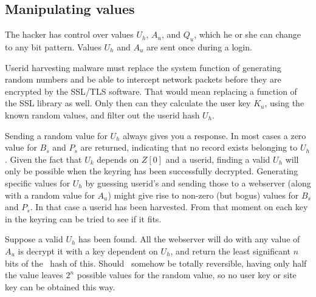 \subsection{Manipulating values}
\label{sec:manipulating_values}
The hacker has control over values $U_h$, $A_u$, and $Q_u$, which he or she can change to any bit pattern.
Values $U_h$ and $A_u$ are sent once during a login.
\par
Userid harvesting malware must replace the system function of generating random numbers
and be able to intercept network packets before they are encrypted by the SSL/TLS software.
That would mean replacing a function of the SSL library as well.
Only then can they calculate the user key $K_u$,
using the known random values,
and filter out the userid hash $U_h$.
\par
Sending a random value for $U_h$ always gives you a response.
In most cases a zero value for $B_s$ and $P_s$ are returned,
indicating that no record exists belonging to $U_h$.
Given the fact that $U_k$ depends on $Z[0]$ and a userid,
finding a valid $U_h$ will only be possible when the keyring
has been successfully decrypted.
Generating specific values for $U_h$ by guessing userid's and sending those to a webserver
(along with a random value for $A_u$)
might give rise to non-zero
(but bogus)
values for $B_s$ and $P_s$.
In that case a userid has been harvested.
From that moment on each key in the keyring can be tried to see if it fits.
\par
Suppose a valid $U_h$ has been found.
All the webserver will do with any value of $A_u$ is decrypt it with a key dependent on $U_h$,
and return the least significant $n$ bits of the \SHA\ hash of this.
Should \SHA\ somehow be totally reversible,
having only half the value leaves $2^n$ possible values for the random value,
so no user key or site key can be obtained this way.
